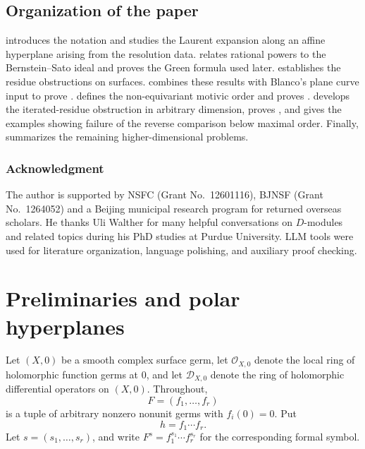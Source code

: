 \documentclass[12pt]{amsart}
\numberwithin{equation}{section}
\theoremstyle{plain}
\theoremstyle{definition}
\theoremstyle{remark}
\theoremstyle{definition}
\newcommand{\D}{\mathscr D}
\begin{document}
\subsection*{Organization of the paper}

 introduces the notation and studies the Laurent expansion along an affine hyperplane arising from the resolution data.  relates rational powers to the Bernstein--Sato ideal and proves the Green formula used later.  establishes the residue obstructions on surfaces.  combines these results with Blanco's plane curve input to prove .  defines the non-equivariant motivic order and proves .  develops the iterated-residue obstruction in arbitrary dimension, proves , and gives the examples showing failure of the reverse comparison below maximal order. Finally,  summarizes the remaining higher-dimensional problems.

\subsubsection*{Acknowledgment}

The author is supported by NSFC (Grant No.~12601116), BJNSF (Grant No.~1264052) and a Beijing municipal research program for returned overseas scholars. He thanks Uli Walther for many helpful conversations on $D$-modules and related topics during his PhD studies at Purdue University. LLM tools were used for literature organization, language polishing, and auxiliary proof checking. 


\makeatletter
\let\@tocwrite\introduction@tocwrite
\makeatother




\section{Preliminaries and polar hyperplanes}\label{sec:setup}

Let $(X,0)$ be a smooth complex surface germ, let $\mathcal O_{X,0}$ denote the local ring of holomorphic function germs at $0$, and let $\D_{X,0}$ denote the ring of holomorphic differential operators on $(X,0)$. Throughout,
\[
 F=(f_1,\ldots,f_r)
\]
is a tuple of arbitrary nonzero nonunit germs with $f_i(0)=0$. Put
\[
 h=f_1\cdots f_r.
\]
Let $s=(s_1,\ldots,s_r)$, and write $F^s=f_1^{s_1}\cdots f_r^{s_r}$ for the corresponding formal symbol.
\end{document}

